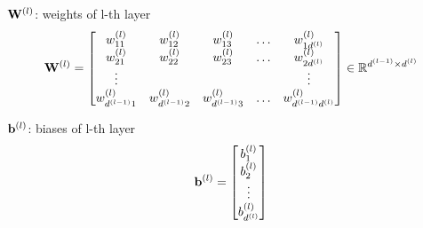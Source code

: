 \documentclass[14pt, a4paper]{article}
\numberwithin{equation}{section}
\numberwithin{algorithm}{section}
\numberwithin{figure}{section}
\begin{document}
$\bold{W}^{(l)}$: weights of l-th layer
\begin{equation*}
		\bold{W}^{(l)}=\begin{bmatrix} w_{11}^{(l)} & w_{12}^{(l)} & w_{13}^{(l)} & \dots & w_{1d^{(l)}}^{(l)} \\ w_{21}^{(l)} & w_{22}^{(l)} & w_{23}^{(l)} & \dots & w_{2d^{(l)}}^{(l)} \\ \vdots & \thickspace & \thickspace & \thickspace & \vdots \\ w_{d^{(l-1)}1}^{(l)} & w_{d^{(l-1)}2}^{(l)} & w_{d^{(l-1)}3}^{(l)} & \dots & w_{d^{(l-1)}d^{(l)}}^{(l)}\end{bmatrix} \in \mathbb{R}^{d^{(l-1)} \times d^{(l)}}
\end{equation*}

$\bold{b}^{(l)}$: biases of l-th layer
\begin{equation*}
	  \bold{b}^{(l)}=\begin{bmatrix} b_1^{(l)} \\  b_2^{(l)} \\ \vdots \\ b_{d^{(l)}}^{(l)} \end{bmatrix}
\end{equation*}
\end{document}
